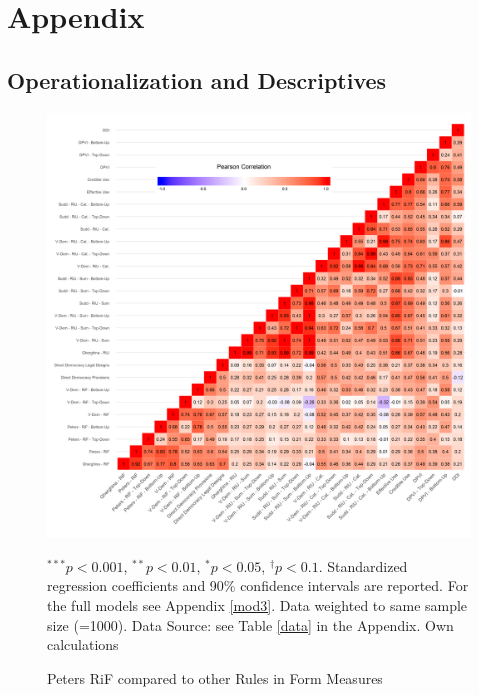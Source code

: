 \documentclass{systats}
\begin{document}
\section{Appendix}
\setcounter{table}{0}
\renewcommand{\thetable}{A\arabic{table}}
\renewcommand\thefigure{A\arabic{figure}} 
\setcounter{figure}{0}    
\subsection{Operationalization and Descriptives}

\begin{figure}
	\caption{Peters RiF compared to other Rules in Form Measures}
	\label{reg2}
	\includegraphics[width=\textwidth]{images/heatmap_fin.png}
	\flushright
	{\scriptsize $^{***}p<0.001$, $^{**}p<0.01$, $^*p<0.05$, $^{\dagger}p<0.1$. Standardized regression coefficients and 90\% confidence intervals are reported. For the full models see Appendix \ref{mod3}. Data weighted to same sample size (=1000). Data Source: see Table \ref{data} in the Appendix. Own calculations  \par}
\end{figure}
\end{document}
